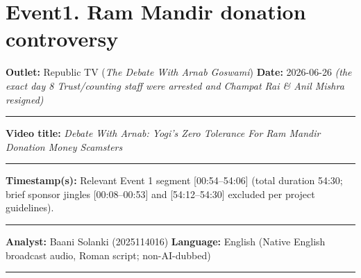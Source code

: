 \documentclass[10pt,a4paper]{article}
\newcommand{\formrule}{\par\vspace{3pt}\noindent\rule{\textwidth}{0.35pt}\par\vspace{7pt}}
\newcommand{\sectionrule}{\par\vspace{4pt}\noindent\rule{\textwidth}{0.4pt}\par\vspace{8pt}}
\begin{document}
\vspace{4pt}

\newpage


\section*{Event1. Ram Mandir donation controversy}
\par\vspace{6pt}
\noindent\textbf{Outlet:} Republic TV (\emph{The Debate With Arnab Goswami}) \hfill \textbf{Date:} 2026-06-26 \emph{(the exact day 8 Trust/counting staff were arrested and Champat Rai \& Anil Mishra resigned)}
\formrule
\noindent\textbf{Video title:} \emph{Debate With Arnab: Yogi's Zero Tolerance For Ram Mandir Donation Money Scamsters}
\formrule
\noindent\textbf{Timestamp(s):} Relevant Event 1 segment [00:54--54:06] (total duration 54:30; brief sponsor jingles [00:08--00:53] and [54:12--54:30] excluded per project guidelines).
\formrule
\noindent\textbf{Analyst:} Baani Solanki (2025114016) \hfill \textbf{Language:} English (Native English broadcast audio, Roman script; non-AI-dubbed)
\sectionrule
\end{document}
